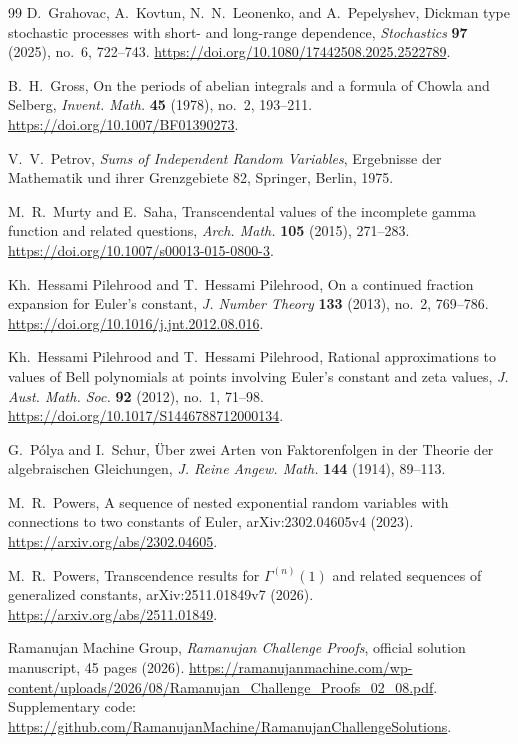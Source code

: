 \documentclass[11pt]{article}
\theoremstyle{definition}
\theoremstyle{remark}
\begin{document}
\begin{thebibliography}{99}
D.~Grahovac, A.~Kovtun, N.~N.~Leonenko, and A.~Pepelyshev,
\newblock Dickman type stochastic processes with short- and long-range
dependence,
\newblock \emph{Stochastics} \textbf{97} (2025), no.~6, 722--743.
\newblock \url{https://doi.org/10.1080/17442508.2025.2522789}.

B.~H.~Gross,
\newblock On the periods of abelian integrals and a formula of Chowla and
Selberg,
\newblock \emph{Invent. Math.} \textbf{45} (1978), no.~2, 193--211.
\newblock \url{https://doi.org/10.1007/BF01390273}.

V.~V.~Petrov,
\newblock \emph{Sums of Independent Random Variables},
\newblock Ergebnisse der Mathematik und ihrer Grenzgebiete 82,
Springer, Berlin, 1975.

M.~R.~Murty and E.~Saha,
\newblock Transcendental values of the incomplete gamma function and
related questions,
\newblock \emph{Arch. Math.} \textbf{105} (2015), 271--283.
\newblock \url{https://doi.org/10.1007/s00013-015-0800-3}.

Kh.~Hessami Pilehrood and T.~Hessami Pilehrood,
\newblock On a continued fraction expansion for Euler's constant,
\newblock \emph{J. Number Theory} \textbf{133} (2013), no.~2, 769--786.
\newblock \url{https://doi.org/10.1016/j.jnt.2012.08.016}.

Kh.~Hessami Pilehrood and T.~Hessami Pilehrood,
\newblock Rational approximations to values of Bell polynomials at points
involving Euler's constant and zeta values,
\newblock \emph{J. Aust. Math. Soc.} \textbf{92} (2012), no.~1, 71--98.
\newblock \url{https://doi.org/10.1017/S1446788712000134}.

G.~P\'olya and I.~Schur,
\newblock \"Uber zwei Arten von Faktorenfolgen in der Theorie der
algebraischen Gleichungen,
\newblock \emph{J. Reine Angew. Math.} \textbf{144} (1914), 89--113.

M.~R.~Powers,
\newblock A sequence of nested exponential random variables with connections
to two constants of Euler,
\newblock arXiv:2302.04605v4 (2023).
\newblock \url{https://arxiv.org/abs/2302.04605}.

M.~R.~Powers,
\newblock Transcendence results for
\(\Gamma^{(n)}(1)\) and related sequences of generalized constants,
\newblock arXiv:2511.01849v7 (2026).
\newblock \url{https://arxiv.org/abs/2511.01849}.

Ramanujan Machine Group,
\newblock \emph{Ramanujan Challenge Proofs},
\newblock official solution manuscript, 45 pages (2026).
\newblock
\url{https://ramanujanmachine.com/wp-content/uploads/2026/08/Ramanujan_Challenge_Proofs_02_08.pdf}.
\newblock Supplementary code:
\url{https://github.com/RamanujanMachine/RamanujanChallengeSolutions}.


\end{thebibliography}
\end{document}

